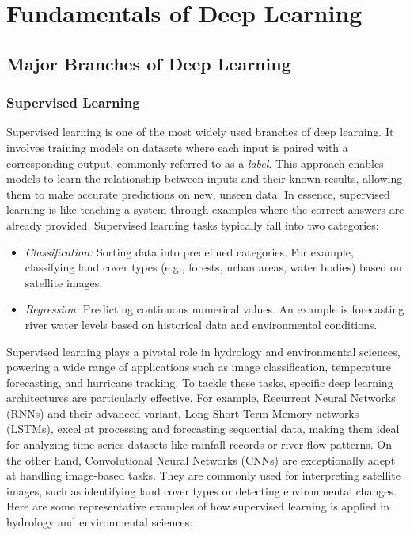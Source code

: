 \chapter{Fundamentals of Deep Learning}
\section{Major Branches of Deep Learning}
\subsection{Supervised Learning}
Supervised learning is one of the most widely used branches of deep learning. It involves training models on datasets where each input is paired with a corresponding output, commonly referred to as a \textit{label}. This approach enables models to learn the relationship between inputs and their known results, allowing them to make accurate predictions on new, unseen data. In essence, supervised learning is like teaching a system through examples where the correct answers are already provided.
Supervised learning tasks typically fall into two categories:
\begin{itemize}
\item \textit{Classification:} Sorting data into predefined categories. For example, classifying land cover types (e.g., forests, urban areas, water bodies) based on satellite images.
\item \textit{Regression:} Predicting continuous numerical values. An example is forecasting river water levels based on historical data and environmental conditions.
\end{itemize}
Supervised learning plays a pivotal role in hydrology and environmental sciences, powering a wide range of applications such as image classification, temperature forecasting, and hurricane tracking. To tackle these tasks, specific deep learning architectures are particularly effective. For example, Recurrent Neural Networks (RNNs) and their advanced variant, Long Short-Term Memory networks (LSTMs), excel at processing and forecasting sequential data, making them ideal for analyzing time-series datasets like rainfall records or river flow patterns. On the other hand, Convolutional Neural Networks (CNNs) are exceptionally adept at handling image-based tasks. They are commonly used for interpreting satellite images, such as identifying land cover types or detecting environmental changes.
Here are some representative examples of how supervised learning is applied in hydrology and environmental sciences:
